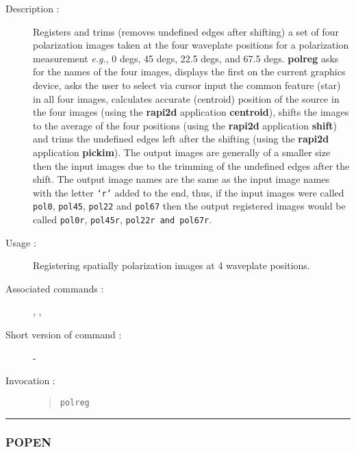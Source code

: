 \begin{description}

\item[Description :] Registers and trims (removes undefined edges after
shifting) a set of four polarization images taken at the four waveplate
positions for a polarization measurement \emph{e.g.}, 0 degs, 45 degs,
22.5 degs, and 67.5 degs.  {\bf polreg} asks for the names of the four
images, displays the first on the current graphics device, asks the
user to select via cursor input the common feature (star) in all four
images, calculates accurate (centroid) position of the source in the
four images (using the {\bf rapi2d} application {\bf centroid}), shifts
the images to the average of the four positions (using the {\bf rapi2d}
application {\bf shift}) and trims the undefined edges left after the
shifting (using the {\bf rapi2d} application {\bf pickim}).  The output
images are generally of a smaller size then the input images due to the
trimming of the undefined edges after the shift.  The output image
names are the same as the input image names with the letter {\tt `r'}
added to the end, thus, if the input images were called {\tt pol0},
{\tt pol45}, {\tt pol22} and {\tt pol67} then the output registered
images would be called {\tt pol0r}, {\tt pol45r}, {\tt pol22r and
pol67r}.

\item[Usage :] Registering spatially polarization images at 4 waveplate 
positions.
\item[Associated commands :] {\tt {}}, 
{\tt {}}, {\tt {}}
\item[Short version of command :] -
\item[Invocation :]

\begin{quote}{\tt  polreg }\end{quote}

\end{description}

\hrule 
\subsubsection*{\label{POPEN}POPEN}

